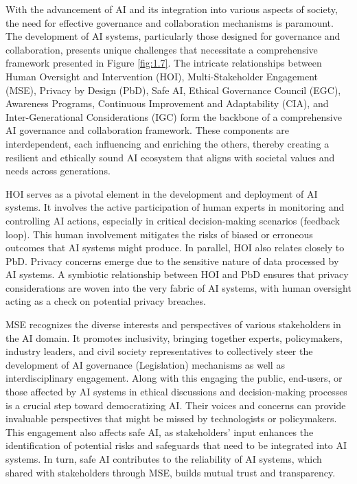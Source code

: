 \documentclass{article}
\begin{document}
With the advancement of AI and its integration into various aspects of society, the need for effective governance and collaboration mechanisms is paramount. The development of AI systems, particularly those designed for governance and collaboration, presents unique challenges that necessitate a comprehensive framework presented in Figure \ref{fig:1.7}. The intricate relationships between Human Oversight and Intervention (HOI), Multi-Stakeholder Engagement (MSE), Privacy by Design (PbD), Safe AI, Ethical Governance Council (EGC), Awareness Programs, Continuous Improvement and Adaptability (CIA), and Inter-Generational Considerations (IGC) form the backbone of a comprehensive AI governance and collaboration framework. These components are interdependent, each influencing and enriching the others, thereby creating a resilient and ethically sound AI ecosystem that aligns with societal values and needs across generations.

HOI serves as a pivotal element in the development and deployment of AI systems. It involves the active participation of human experts in monitoring and controlling AI actions, especially in critical decision-making scenarios (feedback loop). This human involvement mitigates the risks of biased or erroneous outcomes that AI systems might produce. In parallel, HOI also relates closely to PbD. Privacy concerns emerge due to the sensitive nature of data processed by AI systems. A symbiotic relationship between HOI and PbD ensures that privacy considerations are woven into the very fabric of AI systems, with human oversight acting as a check on potential privacy breaches.

MSE recognizes the diverse interests and perspectives of various stakeholders in the AI domain. It promotes inclusivity, bringing together experts, policymakers, industry leaders, and civil society representatives to collectively steer the development of AI governance (Legislation) mechanisms as well as interdisciplinary engagement. Along with this engaging the public, end-users, or those affected by AI systems in ethical discussions and decision-making processes is a crucial step toward democratizing AI. Their voices and concerns can provide invaluable perspectives that might be missed by technologists or policymakers. This engagement also affects safe AI, as stakeholders' input enhances the identification of potential risks and safeguards that need to be integrated into AI systems. In turn, safe AI contributes to the reliability of AI systems, which shared with stakeholders through MSE, builds mutual trust and transparency.
\end{document}
